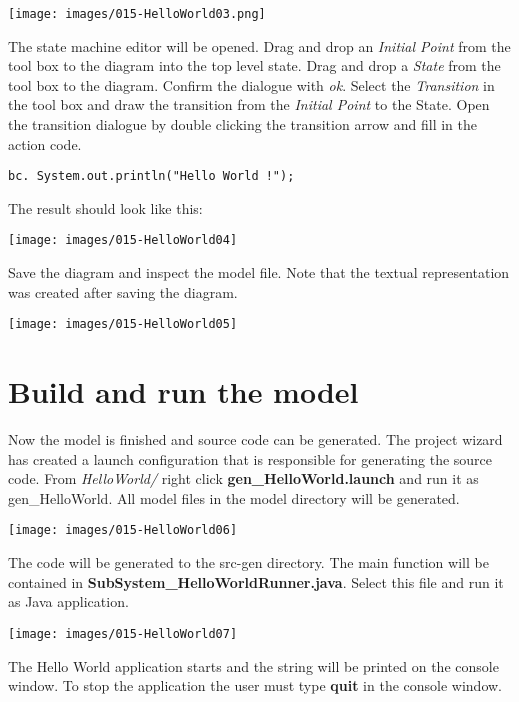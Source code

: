 \texttt{[image: images/015-HelloWorld03.png]}

The state machine editor will be opened. Drag and drop an \textit{Initial Point} from the tool box to the diagram into the top level state. Drag and drop a \textit{State} from the tool box to the diagram. Confirm the dialogue with \textit{ok}. Select the \textit{Transition} in the tool box and draw the transition from the \textit{Initial Point} to the State. Open the transition dialogue by double clicking the transition arrow and fill in the action code.

\begin{verbatim}
bc. System.out.println("Hello World !");
\end{verbatim}
 
The result should look like this:

\texttt{[image: images/015-HelloWorld04]}

Save the diagram and inspect the model file. Note that the textual representation was created after saving the diagram.

\texttt{[image: images/015-HelloWorld05]}


\section{Build and run the model}

Now the model is finished and source code can be generated. The project wizard has created a launch configuration that is responsible for generating the source code. From \textit{HelloWorld/} right click \textbf{gen\_HelloWorld.launch} and run it as gen\_HelloWorld. All model files in the model directory will be generated.

\texttt{[image: images/015-HelloWorld06]}

The code will be generated to the src-gen directory. The main function will be contained in \textbf{SubSystem\_HelloWorldRunner.java}. Select this file and run it as Java application.

\texttt{[image: images/015-HelloWorld07]}


The Hello World application starts and the string will be printed on the console window. To stop the application the user must type \textbf{quit} in the console window.

